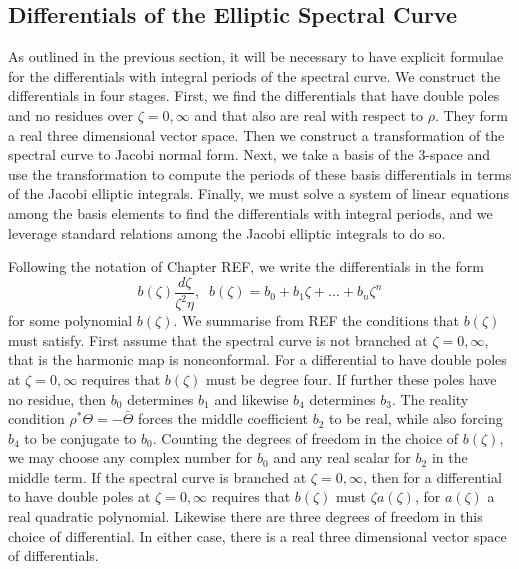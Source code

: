 \subsection{Differentials of the Elliptic Spectral Curve}
\label{sub:Differentials}
As outlined in the previous section, it will be necessary to have explicit formulae for the differentials with integral periods of the spectral curve. We construct the differentials in four stages. First, we find the differentials that have double poles and no residues over $ζ=0,\infty$ and that also are real with respect to $ρ$. They form a real three dimensional vector space. Then we construct a transformation of the spectral curve to Jacobi normal form. Next, we take a basis of the $3$-space and use the transformation to compute the periods of these basis differentials in terms of the Jacobi elliptic integrals. Finally, we must solve a system of linear equations among the basis elements to find the differentials with integral periods, and we leverage standard relations among the Jacobi elliptic integrals to do so.

Following the notation of Chapter REF, we write the differentials in the form
\[
b(ζ)\frac{dζ}{ζ^2η},\;\; b(ζ) = b_0 + b_1ζ + \ldots + b_n ζ^n
\]
for some polynomial $b(ζ)$. We summarise from REF  the conditions that $b(ζ)$ must satisfy. First assume that the spectral curve is not branched at $ζ=0,\infty$, that is the harmonic map is nonconformal.  For a differential to have double poles at $ζ=0,\infty$ requires that $b(ζ)$ must be degree four. If further these poles have no residue, then $b_0$ determines $b_1$ and likewise $b_4$ determines $b_3$. The reality condition $ρ^* Θ = -\bar{Θ}$ forces the middle coefficient $b_2$ to be real, while also forcing $b_4$ to be conjugate to $b_0$. Counting the degrees of freedom in the choice of $b(ζ)$, we may choose any complex number for $b_0$ and any real scalar for $b_2$ in the middle term. If the spectral curve is branched at $ζ=0,\infty$, then for a differential to have double poles at $ζ=0,\infty$ requires that $b(ζ)$ must $ζ a(ζ)$, for $a(ζ)$ a real quadratic polynomial. Likewise there are three degrees of freedom in this choice of differential. In either case, there is a real three dimensional vector space of differentials.

